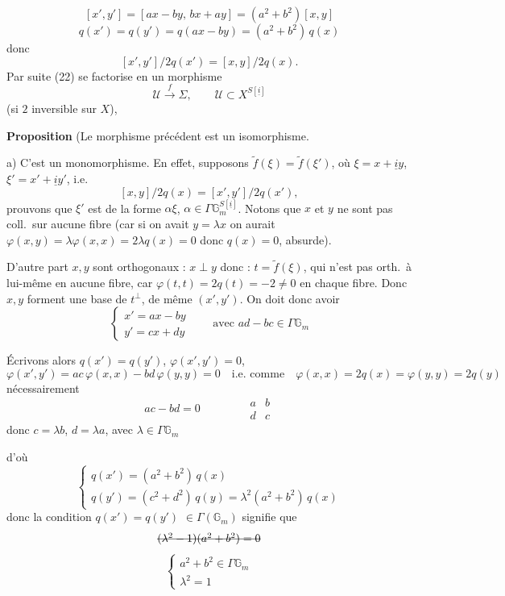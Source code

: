 \documentclass[11pt,a4paper]{article}
\begin{document}
\[
[x',y']=[ax-by,\,bx+ay]=(a^2+b^2)[x,y]
\]
\struck{\ill{}}
\[
q(x')=q(y')=q(ax-by)=(a^2+b^2)\,q(x)
\]
donc
\[
[x',y']/2q(x')=[x,y]/2q(x).
\]
Par suite (22) se factorise en un morphisme
\[
\mathcal{U}\xrightarrow{\ f\ }\Sigma,\qquad \mathcal{U}\subset X^{S[\underline{i}]} \tag{23}
\]
(si $2$ inversible sur $X$),

\textbf{Proposition} (Le morphisme précédent est un isomorphisme.

a) C'est un monomorphisme. En effet, supposons $\tilde f(\xi)=\tilde f(\xi')$, où $\xi=x+\underline{i}y$, $\xi'=x'+\underline{i}y'$, i.e.
\[
[x,y]/2q(x)=[x',y']/2q(x'),
\]
prouvons que $\xi'$ est de la forme $\alpha\xi$, $\alpha\in\Gamma\mathbb{G}_m^{S[\underline{i}]}$. Notons que $x$ et $y$ ne  sont pas coll.\ sur aucune fibre (car si on avait $y=\lambda x$ on aurait $\varphi(x,y)=\lambda\varphi(x,x)=2\lambda q(x)=0$ donc $q(x)=0$, absurde).

D'autre part $x,y$ sont orthogonaux : $x\perp y$ donc : $t=\tilde f(\xi)$, qui n'est pas orth.\ à lui-même en aucune fibre, car $\varphi(t,t)=2q(t)=-2\neq 0$ en chaque fibre. Donc $x,y$ forment une base de $t^{\perp}$, de même $(x',y')$. On doit donc avoir
\[
\begin{cases} x'=ax-by \\ y'=cx+dy \end{cases}\qquad\text{avec } ad-bc\in\Gamma\mathbb{G}_m
\]

\struck{\ill{} \ill{}} Écrivons alors $q(x')=q(y')$, $\varphi(x',y')=0$, \ill{} \ill{}
\[
\varphi(x',y')=ac\,\varphi(x,x)-bd\,\varphi(y,y)=0\quad\text{i.e. comme}\quad \varphi(x,x)=2q(x)=\varphi(y,y)=2q(y)
\]
nécessairement
\[
ac-bd=0\qquad\qquad \begin{matrix} a & b\\ d & c\end{matrix}
\]
donc $c=\lambda b$, $d=\lambda a$, avec $\lambda\in\Gamma\mathbb{G}_m$

 d'où
\[
\begin{cases}
q(x')=(a^2+b^2)\,q(x)\\
q(y')=(c^2+d^2)\,q(y)=\lambda^2(a^2+b^2)\,q(x)
\end{cases}
\]
donc la condition $q(x')=q(y')$ $\in\Gamma(\mathbb{G}_m)$ signifie que
\[
\text{\struck{$(\lambda^2-1)(a^2+b^2)=0$}}
\]
\[
\begin{cases} a^2+b^2\in\Gamma\mathbb{G}_m \\ \lambda^2=1 \end{cases}
\]
  
\end{document}
